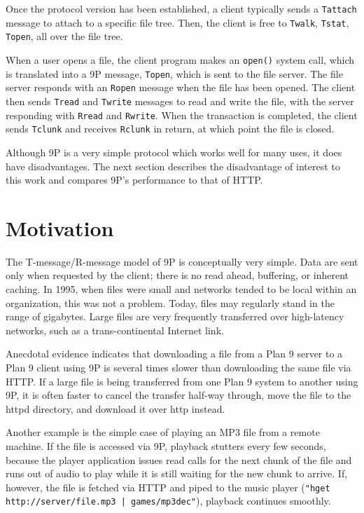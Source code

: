 \documentclass[11pt,american]{report}
\begin{document}
Once the protocol version has been established, a client typically sends a {\tt Tattach} message to attach to a specific file tree. Then, the client is free to {\tt Twalk}, {\tt Tstat}, {\tt Topen}, \etc all over the file tree.

When a user opens a file, the client program makes an {\tt open()} system call, which is translated into a 9P message, {\tt Topen}, which is sent to the file server. The file server responds with an {\tt Ropen} message when the file has been opened. The client then sends {\tt Tread} and {\tt Twrite} messages to read and write the file, with the server responding with {\tt Rread} and {\tt Rwrite}. When the transaction is completed, the client sends {\tt Tclunk} and receives {\tt Rclunk} in return, at which point the file is closed.

Although 9P is a very simple protocol which works well for many uses, it does have disadvantages. The next section describes the disadvantage of interest to this work and compares 9P's performance to that of HTTP.

\section{Motivation}
The T-message/R-message model of 9P is conceptually very simple. Data are sent only when requested by the client; there is no read ahead, buffering, or inherent caching. In 1995, when files were small and networks tended to be local within an organization, this was not a problem. Today, files may regularly stand in the range of gigabytes. Large files are very frequently transferred over high-latency networks, such as a trans-continental Internet link.

Anecdotal evidence indicates that downloading a file from a Plan 9 server to a Plan 9 client using 9P is several times slower than downloading the same file via HTTP. If a large file is being transferred from one Plan 9 system to another using 9P, it is often faster to cancel the transfer half-way through, move the file to the httpd directory, and download it over http instead. 

Another example is the simple case of playing an MP3 file from a remote machine. If the file is accessed via 9P, playback stutters every few seconds, because the player application issues read calls for the next chunk of the file and runs out of audio to play while it is still waiting for the new chunk to arrive. If, however, the file is fetched via HTTP and piped to the music player ({\tt "hget http://server/file.mp3 | games/mp3dec"}), playback continues smoothly.
\end{document}
